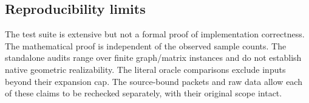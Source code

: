 \subsection{Reproducibility limits}

The test suite is extensive but not a formal proof of implementation
correctness.  The mathematical proof is independent of the observed
sample counts.  The standalone audits range over finite graph/matrix
instances and do not establish native geometric realizability.  The
literal oracle comparisons exclude inputs beyond their expansion cap.
The source-bound packets and raw data allow each of these claims to be
rechecked separately, with their original scope intact.


